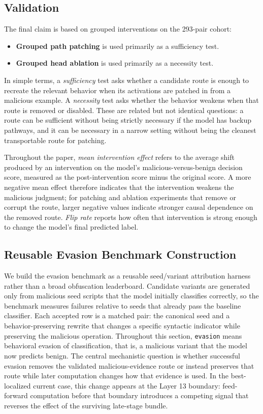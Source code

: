 \documentclass{article}
\begin{document}
\subsection{Validation}
The final claim is based on grouped interventions on the 293-pair cohort:
\begin{itemize}[leftmargin=1.5em,itemsep=0.2em,topsep=0pt,parsep=0pt,partopsep=0pt]
  \item \textbf{Grouped path patching} is used primarily as a sufficiency test.
  \item \textbf{Grouped head ablation} is used primarily as a necessity test.
\end{itemize}

In simple terms, a \emph{sufficiency} test asks whether a candidate route is enough to recreate the relevant behavior when its activations are patched in from a malicious example. A \emph{necessity} test asks whether the behavior weakens when that route is removed or disabled. These are related but not identical questions: a route can be sufficient without being strictly necessary if the model has backup pathways, and it can be necessary in a narrow setting without being the cleanest transportable route for patching.

Throughout the paper, \emph{mean intervention effect} refers to the average shift produced by an intervention on the model's malicious-versus-benign decision score, measured as the post-intervention score minus the original score. A more negative mean effect therefore indicates that the intervention weakens the malicious judgment; for patching and ablation experiments that remove or corrupt the route, larger negative values indicate stronger causal dependence on the removed route. \emph{Flip rate} reports how often that intervention is strong enough to change the model's final predicted label.

\subsection{Reusable Evasion Benchmark Construction}
We build the evasion benchmark as a reusable seed/variant attribution harness rather than a broad obfuscation leaderboard. Candidate variants are generated only from malicious seed scripts that the model initially classifies correctly, so the benchmark measures failures relative to seeds that already pass the baseline classifier. Each accepted row is a matched pair: the canonical seed and a behavior-preserving rewrite that changes a specific syntactic indicator while preserving the malicious operation. Throughout this section, \texttt{evasion} means behavioral evasion of classification, that is, a malicious variant that the model now predicts benign. The central mechanistic question is whether successful evasion removes the validated malicious-evidence route or instead preserves that route while later computation changes how that evidence is used. In the best-localized current case, this change appears at the Layer 13 boundary: feed-forward computation before that boundary introduces a competing signal that reverses the effect of the surviving late-stage bundle.
\end{document}

